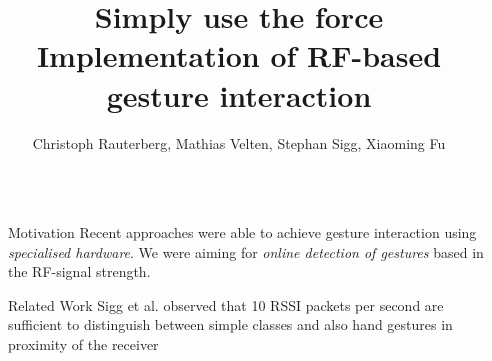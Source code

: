 \documentclass[final,hyperref={pdfpagelabels=false}]{beamer}
\title{\huge Simply use the force \\ \LARGE Implementation of RF-based gesture interaction} %
\author{Christoph Rauterberg, Mathias Velten, Stephan Sigg, Xiaoming Fu} %
\institute{University of G\"ottingen} %
\begin{document}
\large
\setlength{\parindent}{0cm}


\begin{frame}[t] %

\begin{columns}[t] %

\begin{column}{.02\textwidth}\end{column} %

\begin{column}{.465\textwidth} %


% 
% 
% 


\begin{block}{Motivation}
Recent approaches were able to achieve gesture interaction using \emph{specialised hardware}. We were aiming for \emph{online detection of gestures} based in the RF-signal strength.

\end{block}

\begin{block}{Related Work}
Sigg et al. observed that 10 RSSI packets per second are sufficient
to distinguish between simple classes and also hand gestures
in proximity of the receiver
\end{block}


\end{column}
\end{columns}
\end{frame}
\end{document}
